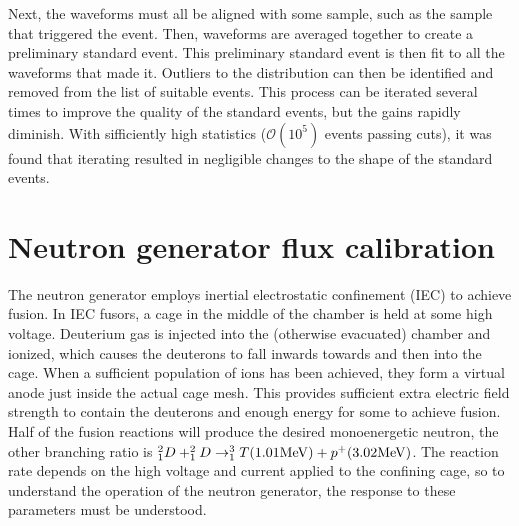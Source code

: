 Next, the waveforms must all be aligned with some sample, such as the sample that triggered the event. Then, waveforms are averaged together to create a preliminary standard event. This preliminary standard event is then fit to all the waveforms that made it. Outliers to the distribution can then be identified and removed from the list of suitable events. This process can be iterated several times to improve the quality of the standard events, but the gains rapidly diminish. With sifficiently high statistics ($\mathcal{O}(10^5)$ events passing cuts), it was found that iterating resulted in negligible changes to the shape of the standard events.

\section{Neutron generator flux calibration}

The neutron generator employs inertial electrostatic confinement (IEC) to achieve fusion. In IEC fusors, a cage in the middle of the chamber is held at some high voltage. Deuterium gas is injected into the (otherwise evacuated) chamber and ionized, which causes the deuterons to fall inwards towards and then into the cage. When a sufficient population of ions has been achieved, they form a virtual anode just inside the actual cage mesh. This provides sufficient extra electric field strength to contain the deuterons and enough energy for some to achieve fusion. Half of the fusion reactions will produce the desired monoenergetic neutron, the other branching ratio is $^2_1D + ^2_1D \rightarrow ^3_1T (1.01 \mathrm{MeV}) + p^+ (3.02 \mathrm{MeV})$. The reaction rate depends on the high voltage and current applied to the confining cage, so to understand the operation of the neutron generator, the response to these parameters must be understood.
